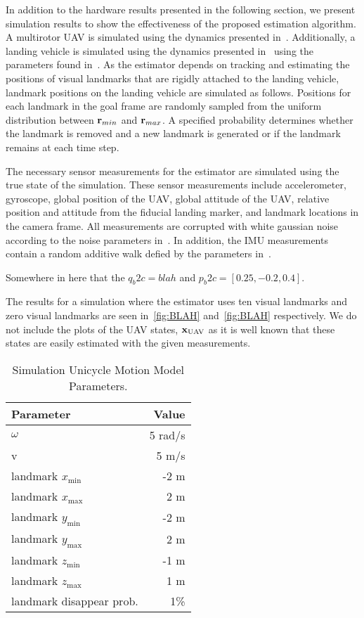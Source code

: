 
In addition to the hardware results presented in the following section, we
present simulation results to show the effectiveness of the proposed estimation
algorithm.
A multirotor UAV is simulated using the dynamics presented in~.
Additionally, a landing vehicle is simulated using the dynamics presented
in~ using the parameters found
in~. As the estimator depends on
tracking and estimating the positions of visual landmarks that are rigidly
attached to the landing vehicle, landmark positions on the landing vehicle
are simulated as follows.
Positions for each landmark in the goal frame are
randomly sampled from the
uniform distribution between $\boldsymbol{\mathrm{r}}_{min}$ and $\boldsymbol{\mathrm{r}}_{max}$. A specified probability determines
whether the landmark is removed and a new landmark is generated or if the landmark
remains at each time step.

The necessary sensor measurements for the estimator are simulated using the true
state of the simulation. These sensor measurements include accelerometer,
gyroscope, global position of the UAV, global attitude 
of the UAV, relative position and attitude from the fiducial landing marker, and
landmark locations in the camera frame. All measurements are
corrupted with white gaussian noise according to the noise parameters
in~. In addition, the IMU measurements contain a random
additive walk defied by the parameters in~.

Somewhere in here that the $q_b2c = blah$ and $p_b2c = [0.25, -0.2, 0.4]$.

The results for a simulation where the estimator uses ten visual landmarks and
zero visual landmarks are seen in~\ref{fig:BLAH} and~\ref{fig:BLAH}
respectively. We do not include the plots of the UAV states,
$\boldsymbol{\mathrm{x}}_{\text{UAV}}$ as it is well known that these states are easily
estimated with the given measurements.




\begin{table}[h!]
  \begin{center}
    \caption{Simulation Unicycle Motion Model Parameters.}
    \label{tab:sim_unicycle}
    \begin{tabular}{l|r}
      \textbf{Parameter} & \textbf{Value} \\
      \hline
      $\omega$ & 5 rad/s \\
      v & 5 m/s \\
      landmark $x_{\text{min}}$ & -2 m \\
      landmark $x_{\text{max}}$ & 2 m \\
      landmark $y_{\text{min}}$ & -2 m \\
      landmark $y_{\text{max}}$ & 2 m \\
      landmark $z_{\text{min}}$ & -1 m \\
      landmark $z_{\text{max}}$ & 1 m \\
      landmark disappear prob. & 1\% \\
    \end{tabular}
  \end{center}
\end{table}

